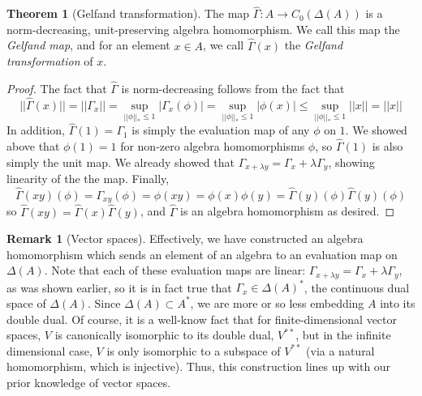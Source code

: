 \documentclass[aps,pra,showpacs,notitlepage,onecolumn,superscriptaddress,nofootinbib]{revtex4-1}
\theoremstyle{definition}
\newtheorem{theorem}{Theorem}[section]
\newtheorem{remark}{Remark}[section]
\begin{document}
\begin{theorem}[Gelfand transformation]
  The map $\widehat{\Gamma} : A \rightarrow C_0(\Delta(A))$ is a norm-decreasing, unit-preserving algebra homomorphism. We call this map the \emph{Gelfand map}, and
  for an element $x \in A$, we call $\widehat{\Gamma}(x)$ the \emph{Gelfand transformation} of $x$.
\end{theorem}

\begin{proof}
  The fact that $\widehat{\Gamma}$ is norm-decreasing follows from the fact that
  \begin{equation}
    || \widehat{\Gamma}(x) || = || \Gamma_x || = \sup_{|| \phi ||_{*} \leq 1} | \Gamma_x(\phi) | = \sup_{|| \phi ||_{*} \leq 1} |\phi(x)| \leq \sup_{|| \phi ||_{*} \leq 1} ||x|| = ||x||
  \end{equation}
  In addition, $\widehat{\Gamma}(1) = \Gamma_1$ is simply the evaluation map of any $\phi$ on $1$. We showed above that $\phi(1) = 1$ for non-zero algebra homomorphisms $\phi$,
  so $\widehat{\Gamma}(1)$ is also simply the unit map. We already showed that $\Gamma_{x + \lambda y} = \Gamma_x + \lambda \Gamma_y$, showing linearity of the the map. Finally,
  \begin{equation}
    \widehat{\Gamma}(xy)(\phi) = \Gamma_{xy}(\phi) = \phi(xy) = \phi(x) \phi(y) = \widehat{\Gamma}(y)(\phi) \widehat{\Gamma}(y)(\phi)
  \end{equation}
  so $\widehat{\Gamma}(xy) = \widehat{\Gamma}(x) \widehat{\Gamma}(y)$, and $\widehat{\Gamma}$ is an algebra homomorphism as desired.
\end{proof}

\begin{remark}[Vector spaces]
  Effectively, we have constructed an algebra homomorphism which sends an element of an algebra to an evaluation map on $\Delta(A)$. Note that each of these evaluation maps are linear:
$\Gamma_{x + \lambda y} = \Gamma_x + \lambda \Gamma_y$, as was shown earlier, so it is in fact true that $\Gamma_x \in \Delta(A)^{*}$, the continuous dual space of $\Delta(A)$. Since $\Delta(A) \subset A^{*}$,
  we are more or so less embedding $A$ into its double dual. Of course, it is a well-know fact that for finite-dimensional vector spaces, $V$ is canonically isomorphic to its double dual, $V^{**}$, but
  in the infinite dimensional case, $V$ is only isomorphic to a subspace of $V^{**}$ (via a natural homomorphism, which is injective). Thus, this construction lines up with our prior knowledge of vector spaces.
\end{remark}
\end{document}
